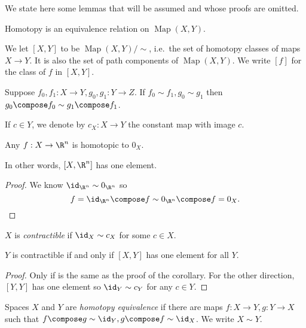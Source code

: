 \documentclass[a4paper]{article}
\DeclareMathOperator{\Map}{Map} %
\begin{document}
We state here some lemmas that will be assumed and whose proofs are omitted.

\begin{lemma}
  Homotopy is an equivalence relation on \(\Map(X, Y)\).
\end{lemma}

\begin{definition}
  We let \([X, Y]\) to be \(\Map(X, Y)/\sim\), i.e.\ the set of homotopy classes of maps \(X \to Y\). It is also the set of path components of \(\Map(X, Y)\). We write \([f]\) for the class of \(f\) in \([X, Y]\).
\end{definition}

\begin{lemma}
  Suppose \(f_0, f_1: X \to Y, g_0, g_1 : Y \to Z\). If \(f_0 \sim f_1, g_0 \sim g_1\) then \(g_0 \compose f_0 \sim g_1 \compose f_1\).
\end{lemma}

\begin{notation}
  If \(c \in Y\), we denote by \(c_X: X \to Y\) the constant map with image \(c\).
\end{notation}

\begin{corollary}
  Any \(f: X \to \R^n\) is homotopic to \(0_X\).
\end{corollary}

In other words, \([X, \R^n]\) has one element.

\begin{proof}
  We know \(\id_{\R^n} \sim 0_{\R^n}\) so
  \[
    f = \id_{\R^n} \compose f \sim 0_{\R^n} \compose f = 0_X.
  \]
\end{proof}

\begin{definition}[contractible]
  \(X\) is \emph{contractible} if \(\id_X \sim c_X\) for some \(c \in X\).
\end{definition}

\begin{proposition}
  \(Y\) is contractible if and only if \([X, Y]\) has one element for all \(Y\).
\end{proposition}

\begin{proof}
  Only if is the same as the proof of the corollary. For the other direction, \([Y, Y]\) has one element so \(\id_Y \sim c_Y\) for any \(c \in Y\).
\end{proof}

\begin{definition}
  Spaces \(X\) and \(Y\) are \emph{homotopy equivalence} if there are maps \(f: X \to Y, g: Y \to X\) such that \(f \compose g \sim \id_Y, g \compose f \sim \id_X\). We write \(X \sim Y\).
\end{definition}
\end{document}
